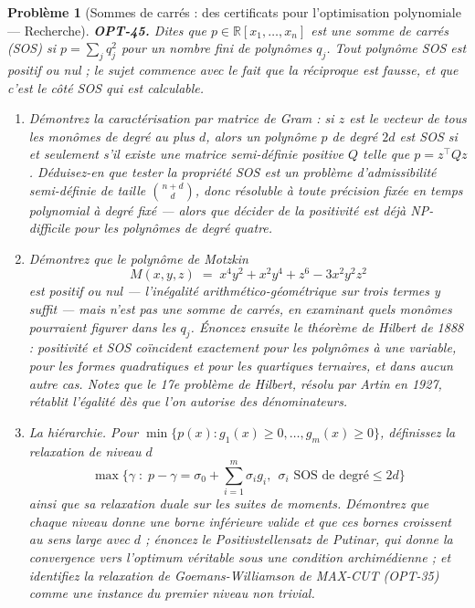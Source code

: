 \documentclass[11pt]{article}
\newtheorem{problem}{Problème}
\begin{document}
\begin{problem}[{Sommes de carrés : des certificats pour l'optimisation polynomiale --- Recherche}]
\textbf{OPT-45.} Dites que $p \in \mathbb{R}[x_1,\ldots,x_n]$ est une \textit{somme de carrés} (SOS) si $p = \sum_j q_j^2$ pour un nombre fini de polynômes $q_j$. Tout polynôme SOS est positif ou nul ; le sujet commence avec le fait que la réciproque est fausse, et que c'est le côté SOS qui est calculable.
\begin{enumerate}
\item[(a)] Démontrez la caractérisation par matrice de Gram : si $z$ est le vecteur de tous les monômes de degré au plus $d$, alors un polynôme $p$ de degré $2d$ est SOS si et seulement s'il existe une matrice semi-définie positive $Q$ telle que $p = z^{\top}Qz$. Déduisez-en que tester la propriété SOS est un problème d'admissibilité semi-définie de taille $\binom{n+d}{d}$, donc résoluble à toute précision fixée en temps polynomial à degré fixé --- alors que décider de la positivité est déjà NP-difficile pour les polynômes de degré quatre.
\item[(b)] Démontrez que le polynôme de Motzkin
\[ M(x,y,z) \;=\; x^4y^2 + x^2y^4 + z^6 - 3x^2y^2z^2 \]
est positif ou nul --- l'inégalité arithmético-géométrique sur trois termes y suffit --- mais n'est pas une somme de carrés, en examinant quels monômes pourraient figurer dans les $q_j$. Énoncez ensuite le théorème de Hilbert de 1888 : positivité et SOS coïncident exactement pour les polynômes à une variable, pour les formes quadratiques et pour les quartiques ternaires, et dans aucun autre cas. Notez que le 17e problème de Hilbert, résolu par Artin en 1927, rétablit l'égalité dès que l'on autorise des dénominateurs.
\item[(c)] La hiérarchie. Pour $\min\{p(x) : g_1(x) \ge 0, \ldots, g_m(x) \ge 0\}$, définissez la relaxation de niveau $d$
\[ \max\Big\{\gamma \;:\; p - \gamma = \sigma_0 + \sum_{i=1}^{m}\sigma_i g_i,\ \ \sigma_i \text{ SOS de degré} \le 2d \Big\} \]
ainsi que sa relaxation duale sur les suites de moments. Démontrez que chaque niveau donne une borne inférieure valide et que ces bornes croissent au sens large avec $d$ ; énoncez le Positivstellensatz de Putinar, qui donne la convergence vers l'optimum véritable sous une condition archimédienne ; et identifiez la relaxation de Goemans-Williamson de MAX-CUT (OPT-35) comme une instance du premier niveau non trivial.

\end{enumerate}
\end{problem}
\end{document}
